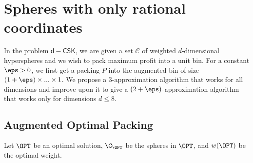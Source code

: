 \section{Spheres with only rational coordinates}
\label{sec:weighted}

In the problem $\mathsf{d-CSK}$, we are given a set $\mathcal{C}$ of weighted $d$-dimensional hyperspheres and we wish to pack maximum profit into a unit bin.
For a constant $\eps>0$, we first get a packing $P$ into the augmented bin of size \((1+\eps) \times ... \times 1\).
We propose a $3$-approximation algorithm that works for all dimensions and improve upon it to give a $(2+\eps)$-approximation algorithm that works only for dimensions $d\leqslant 8$.

\subsection{Augmented Optimal Packing}

Let $\OPT$ be an optimal solution, $\C_{\OPT}$ be the spheres in $\OPT$, and $w(\OPT)$ be the optimal weight.

